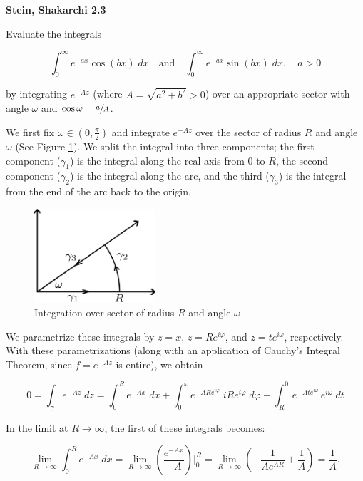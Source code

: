 \textbf{Stein, Shakarchi 2.3}

Evaluate the integrals 

$$
\int_{0}^{\infty} {e^{-ax} \cos{(bx)} \; dx} \quad \text{and} \quad \int_{0}^{\infty} {e^{-ax} \sin{(bx)} \; dx}, \quad a > 0
$$

by integrating $e^{-Az}$ (where $A = \sqrt{a^2 + b^2} > 0$) over an appropriate sector with angle $\omega$ and 
$\cos{\omega} = \sfrac{a}{A}$.

\begin{solution}
    We first fix $\omega \in \left(0, \frac{\pi}{2} \right)$ and integrate $e^{-Az}$ over the sector of radius $R$ and 
    angle $\omega$ (See Figure \ref{fig:problem_3}). We split the integral into three components; the first component 
    ($\gamma_1$) is the integral along the real axis from $0$ to $R$, the second component ($\gamma_2$) is the integral 
    along the arc, and the third ($\gamma_3$) is the integral from the end of the arc back to the origin. 

    \begin{figure}[h]
        \centering
        \includegraphics*[width=0.4\textwidth]{problem_3.png}
        \caption{Integration over sector of radius $R$ and angle $\omega$}
        \label{fig:problem_3}
    \end{figure}
    
    We parametrize these integrals by $z = x$, $z = Re^{i\varphi}$, and $z = t e^{i\omega}$, respectively. With these 
    parametrizations (along with an application of Cauchy's Integral Theorem, since $f = e^{-Az}$ is entire), we obtain

    $$
    0 = \int_{\gamma} {e^{-Az}} \; dz = \int_{0}^{R} {e^{-Ax}} \; dx + \int_{0}^{\omega} {e^{-ARe^{i\varphi}} \; iRe^{i\varphi}} \; d\varphi + \int_{R}^{0} {e^{-Ate^{i\omega}} \, e^{i\omega}} \; dt
    $$

    In the limit at $R \to \infty$, the first of these integrals becomes:

    $$
    \lim_{R \to \infty} \int_{0}^{R} {e^{-Ax}} \; dx = \lim_{R \to \infty} \left( \frac{e^{-Ax}}{-A} \right)\bigg|_{0}^{R} 
                                                     = \lim_{R \to \infty} \left( -\frac{1}{A e^{AR}} + \frac{1}{A} \right)
                                                     = \frac{1}{A}.
    $$


\end{solution}
